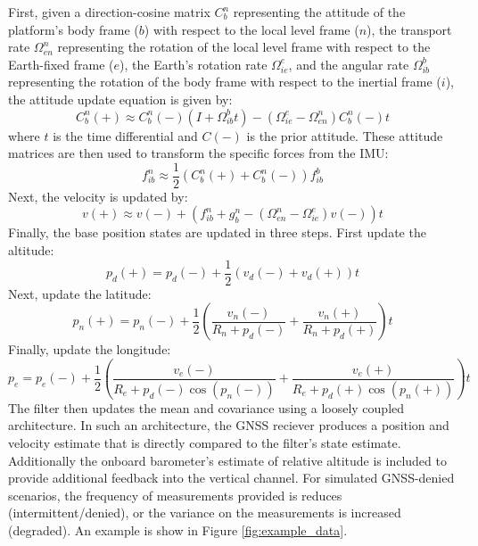 \documentclass[sageh,times]{sagej}
\begin{document}
First, given a direction-cosine matrix \(C_b^n\) representing the attitude of the platform's body frame (\(b\)) with respect to the local level frame (\(n\)), the transport rate \(\Omega_{en}^n\) representing the rotation of the local level frame with respect to the Earth-fixed frame (\(e\)), the Earth's rotation rate \(\Omega_{ie}^e\), and the angular rate \(\Omega_{ib}^b\) representing the rotation of the body frame with respect to the inertial frame (\(i\)), the attitude update equation is given by:
\[
C_b^n(+) \approx C_b^n(-) \left( I + \Omega_{ib}^b t \right) - \left( \Omega_{ie}^e - \Omega_{en}^n \right) C_b^n(-) t
\]
where \(t\) is the time differential and \(C(-)\) is the prior attitude. These attitude matrices are then used to transform the
specific forces from the IMU:
\[
f_{ib}^n \approx \frac{1}{2} \left( C_b^n(+) + C_b^n(-) \right) f_{ib}^b
\]
Next, the velocity is updated by:
\[
v(+) \approx v(-) + \left( f_{ib}^n + g_{b}^n - \left( \Omega_{en}^n - \Omega_{ie}^e \right) v(-) \right) t
\]
Finally, the base position states are updated in three steps. First update the altitude:
\[
p_d(+) = p_d(-) + \frac{1}{2} \left( v_d(-) + v_d(+) \right) t
\]
Next, update the latitude:
\[
p_n(+) = p_n(-) + \frac{1}{2} \left( \frac{v_n(-)}{R_n + p_d(-)} + \frac{v_n(+)}{R_n + p_d(+) } \right) t
\]
Finally, update the longitude:
\[
p_e = p_e(-) + \frac{1}{2} \left( \frac{v_e(-)}{R_e + p_d(-) \cos(p_n(-))} + \frac{v_e(+)}{R_e + p_d(+) \cos(p_n(+))} \right) t
\]
The filter then updates the mean and covariance using a loosely coupled architecture. In such an architecture, the GNSS reciever produces a position and velocity estimate that is directly compared to the filter's state estimate. Additionally the onboard barometer's estimate of relative altitude is included to provide additional feedback into the vertical channel. For simulated GNSS-denied scenarios, the frequency of measurements provided is reduces (intermittent/denied), or the variance on the measurements is increased (degraded). An example is show in Figure \ref{fig:example_data}.
\end{document}
